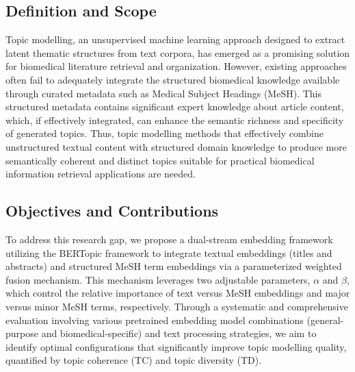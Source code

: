 \documentclass[utf8]{FrontiersinHarvard}
\begin{document}
\subsection{Definition and Scope}
Topic modelling, an unsupervised machine learning approach designed to extract latent thematic structures from text corpora, has emerged as a promising solution for biomedical literature retrieval and organization. However, existing approaches often fail to adequately integrate the structured biomedical knowledge available through curated metadata such as Medical Subject Headings (MeSH). This structured metadata contains significant expert knowledge about article content, which, if effectively integrated, can enhance the semantic richness and specificity of generated topics. Thus, topic modelling methods that effectively combine unstructured textual content with structured domain knowledge to produce more semantically coherent and distinct topics suitable for practical biomedical information retrieval applications are needed.

\subsection{Objectives and Contributions}
To address this research gap, we propose a dual-stream embedding framework utilizing the BERTopic framework to integrate textual embeddings (titles and abstracts) and structured MeSH term embeddings via a parameterized weighted fusion mechanism. This mechanism leverages two adjustable parameters, $\alpha$ and $\beta$, which control the relative importance of text versus MeSH embeddings and major versus minor MeSH terms, respectively. Through a systematic and comprehensive evaluation involving various pretrained embedding model combinations (general-purpose and biomedical-specific) and text processing strategies, we aim to identify optimal configurations that significantly improve topic modelling quality, quantified by topic coherence (TC) and topic diversity (TD).
\end{document}
